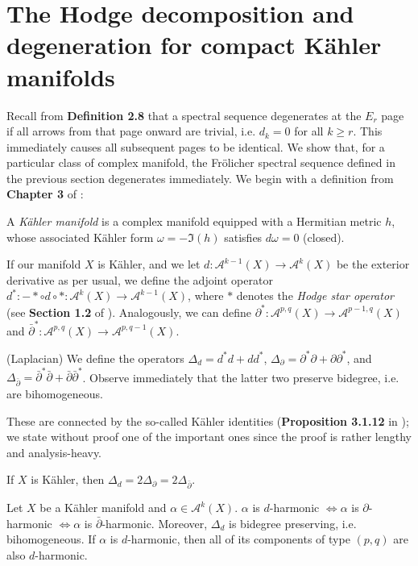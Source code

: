\documentclass[11pt]{article}
\theoremstyle{definition}
\numberwithin{theorem}{section} %
\numberwithin{equation}{section} %
\begin{document}
\section{The Hodge decomposition and degeneration for compact K\"ahler manifolds}
Recall from \textbf{Definition 2.8} that a spectral sequence degenerates at the $E_r$ page if all arrows from that page onward are trivial, i.e. $d_k=0$ for all $k\geq r$. This immediately causes all subsequent pages to be identical. We show that, for a particular class of complex manifold, the Fr\"olicher spectral sequence defined in the previous section degenerates immediately. We begin with a definition from \textbf{Chapter 3} of \cite{VoisinI2002}:

\begin{definition}
    A \emph{K\"ahler manifold} is a complex manifold equipped with a Hermitian metric $h$, whose associated K\"ahler form $\omega = -\Im(h)$ satisfies $d\omega =0$ (closed). 
\end{definition}

\noindent If our manifold $X$ is K\"ahler, and we let $d:\mathcal{A}^{k-1}(X) \to \mathcal{A}^k(X)$ be the exterior derivative as per usual, we define the adjoint operator $d^*: -*\circ d\circ *:\mathcal{A}^k(X) \to \mathcal{A}^{k-1}(X)$, where $*$ denotes the \emph{Hodge star operator} (see \textbf{Section 1.2} of \cite{Huybrechts2005}). Analogously, we can define $\partial^*:\mathcal{A}^{p,q}(X) \to \mathcal{A}^{p-1,q}(X)$ and $\bar\partial^*:\mathcal{A}^{p,q}(X) \to \mathcal{A}^{p,q-1}(X)$.

\begin{definition}
    (Laplacian) We define the operators $\Delta_d = d^*d + dd^*$, $\Delta_\partial = \partial^*\partial+\partial\partial^*$, and $\Delta_{\bar \partial} = \bar\partial^*\bar\partial + \bar\partial \bar\partial^*$. Observe immediately that the latter two preserve bidegree, i.e. are bihomogeneous.
\end{definition}

\noindent These are connected by the so-called K\"ahler identities (\textbf{Proposition 3.1.12} in \cite{Huybrechts2005}); we state without proof one of the important ones since the proof is rather lengthy and analysis-heavy.

\begin{lemma}
If $X$ is K\"ahler, then $\Delta_d = 2\Delta_\partial = 2\Delta_{\bar \partial}$.
\end{lemma}

\begin{corollary}
    Let $X$ be a K\"ahler manifold and $\alpha\in \mathcal{A}^k(X)$. $\alpha$ is $d$-harmonic $\iff \alpha$ is $\partial$-harmonic $\iff \alpha$ is $\bar\partial$-harmonic. Moreover, $\Delta_d$ is bidegree preserving, i.e. bihomogeneous. If $\alpha$ is $d$-harmonic, then all of its components of type $(p,q)$ are also $d$-harmonic. 
\end{corollary}
\end{document}
